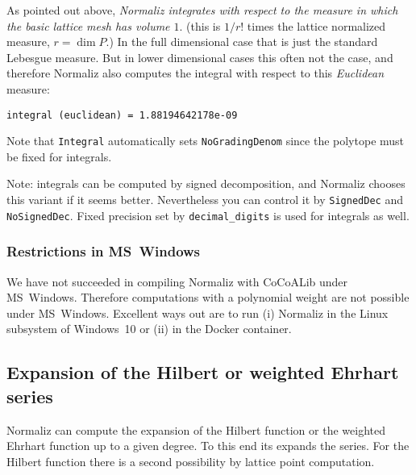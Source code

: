 \documentclass[12pt,a4paper]{scrartcl}
\theoremstyle{definition}
\def\ttt{\texttt}
\begin{document}
As pointed out above, \emph{Normaliz integrates with respect to the measure in which the basic lattice mesh has volume $1$}. (this is $1/r!$ times the lattice normalized measure, $r=\dim P$.) In the full dimensional case that is just the standard Lebesgue measure. But in lower dimensional cases this often not the case, and therefore Normaliz also computes the integral with respect to this \emph{Euclidean} measure:
\begin{Verbatim}
integral (euclidean) = 1.88194642178e-09
\end{Verbatim}

Note that \verb|Integral| automatically sets \verb|NoGradingDenom| since the polytope must be fixed for integrals.

Note: integrals can be computed by signed decomposition, and Normaliz chooses this variant if it seems better. Nevertheless you can control it by \ttt{SignedDec} and \ttt{NoSignedDec}. Fixed precision set by \verb|decimal_digits| is used for integrals as well.

\subsubsection{Restrictions in MS~Windows}

We have not succeeded in compiling Normaliz with CoCoALib under MS~Windows. Therefore computations with a polynomial weight are not possible under MS~Windows.
Excellent ways out are to run (i) Normaliz in the Linux subsystem of Windows~10 or (ii) in the Docker container.

\subsection{Expansion of the Hilbert or weighted Ehrhart series}\label{expansion}

Normaliz can compute the expansion of the Hilbert function or the weighted Ehrhart function up to a given degree. To this end its expands the series. For the Hilbert function there is a second possibility by lattice point computation.
\end{document}
